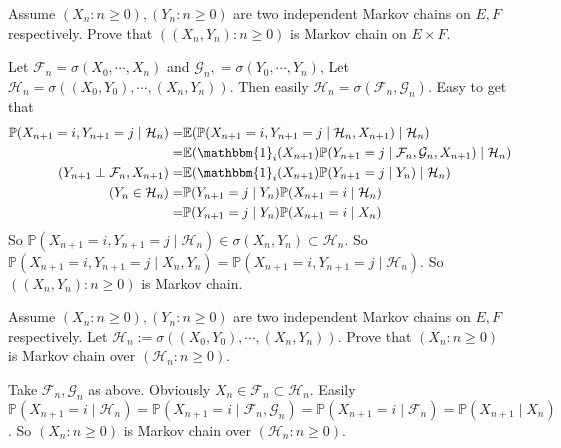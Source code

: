 \documentclass[../main]{subfiles}
\begin{document}
\begin{problem}\label{pro:4}
  Assume \((X_n:n \geq 0),(Y_n:n \geq 0)\) are two independent Markov chains on \(E,F\) respectively.
  Prove that \(((X_n,Y_n): n \geq 0)\) is Markov chain on \(E \times F\).
\end{problem}
\begin{solution}
  Let \(\mathcal{F}_n=\sigma(X_0,\cdots,X_n)\) and \(\mathcal{G}_n,=\sigma(Y_0,\cdots,Y_n)\),
  Let \(\mathcal{H}_n=\sigma((X_0,Y_0),\cdots,(X_n,Y_n))\).
  Then easily \(\mathcal{H}_n=\sigma(\mathcal{F}_n,\mathcal{G}_n)\).
  Easy to get that
  \[
    \begin{aligned}
      \mathbb{P}(X_{n+1} =i,Y_{n+1} =j \mid \mathcal{H}_n)
      =                                       & \mathbb{E}(\mathbb{P}(X_{n+1} =i,Y_{n+1} =j \mid \mathcal{H}_n,X_{n+1} )\mid \mathcal{H}_n)                            \\
      =                                       & \mathbb{E}(\mathbbm{1}_i(X_{n+1} )\mathbb{P}(Y_{n+1} =j \mid \mathcal{F}_n,\mathcal{G}_n,X_{n+1} ) \mid \mathcal{H}_n) \\
      (Y_{n+1} \perp \mathcal{F}_n,X_{n+1} )= & \mathbb{E}(\mathbbm{1}_i(X_{n+1} )\mathbb{P}(Y_{n+1} =j \mid Y_n) \mid \mathcal{H}_n)                                  \\
      (Y_n \in \mathcal{H}_n)=                & \mathbb{P}(Y_{n+1} =j \mid Y_n)\mathbb{P}(X_{n+1} =i \mid \mathcal{H}_n)                                               \\
      =                                       & \mathbb{P}(Y_{n+1} =j \mid Y_n)\mathbb{P}(X_{n+1} =i \mid X_n)                                                         \\
    \end{aligned}
  \]
  So \(\mathbb{P}(X_{n+1} =i,Y_{n+1}=j \mid \mathcal{H}_n) \in \sigma(X_n,Y_n) \subset \mathcal{H}_n\).
  So \(\mathbb{P}(X_{n+1}=i,Y_{n+1}=j \mid X_n,Y_n)=\mathbb{P}(X_{n+1}=i,Y_{n+1}=j \mid \mathcal{H}_n)\).
  So \(((X_n,Y_n):n \geq 0)\) is Markov chain.
\end{solution}
\begin{problem}\label{pro:5}
  Assume \((X_n:n \geq 0),(Y_n:n \geq 0)\) are two independent Markov chains on \(E,F\) respectively.
  Let \(\mathcal{H}_n:=\sigma((X_0,Y_0),\cdots,(X_n,Y_n))\).
  Prove that \((X_n:n \geq 0)\) is Markov chain over \((\mathcal{H}_n:n \geq 0)\).
\end{problem}
\begin{solution}
  Take \(\mathcal{F}_n,\mathcal{G}_n\) as above.
  Obviously \(X_n \in \mathcal{F}_n \subset \mathcal{H}_n\).
  Easily \(\mathbb{P}(X_{n+1}=i \mid \mathcal{H}_n)=\mathbb{P}(X_{n+1} =i \mid \mathcal{F}_n,\mathcal{G}_n)=\mathbb{P}(X_{n+1} =i \mid \mathcal{F}_n)=\mathbb{P}(X_{n+1} \mid X_n)\).
  So \((X_n:n \geq 0)\) is Markov chain over \((\mathcal{H}_n:n \geq 0)\).
\end{solution}
\end{document}
